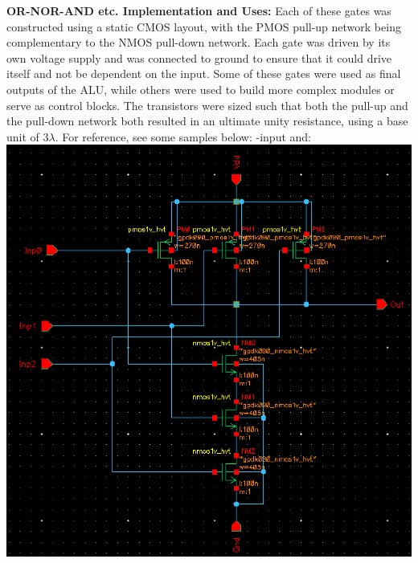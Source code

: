 \documentclass[12pt]{article}
\begin{document}
	\textbf{OR-NOR-AND etc. Implementation and Uses:}
	\newline \newline
	Each of these gates was constructed using a static CMOS layout, with the PMOS pull-up 
	network being complementary to the NMOS pull-down network. Each gate was driven by
	its own voltage supply and was connected to ground to ensure that it could drive itself and
	not be dependent on the input. Some of these gates were used as final outputs of the ALU,
	while others were used to build more complex modules or serve as control blocks. The 
	transistors were sized such that both the pull-up and the pull-down network
	both resulted in an ultimate unity resistance, using a base unit of 3$\lambda$. 
	For reference, see some samples below:
	\newline \newline \newline \newline \newline \newline {}-input and:\\
  	\includegraphics[scale=0.4]{3and.png} \\
	\newline \newline
\end{document}
